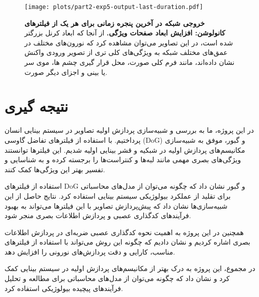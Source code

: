                 \begin{figure}[!ht]
                    \centering
                    \texttt{[image: plots/part2-exp5-output-last-duration.pdf]} 
                    \captionsetup{width=.9\linewidth}
                    \caption{\textbf{ خروجی شبکه در آخرین پنجره زمانی برای هر یک از فیلترهای کانولوشن: افزایش ابعاد صفحات ویژگی. } از آنجا که ابعاد کرنل بزرگتر شده است، در این تصاویر می‌توان مشاهده کرد که نورون‌های مختلف در عمق‌های مختلف شبکه به ویژگی‌های کلی تری از تصویر ورودی واکنش نشان داده‌اند، مانند فرم کلی صورت، محل قرار گیری چشم ها، موی سر یا بینی و اجزای دیگر صورت. 
                    }
                    \label{fig:part2-exp5-output-last-duration}
                \end{figure}
    
                \clearpage
    
    \section*{نتیجه گیری}
        در این پروژه، ما به بررسی و شبیه‌سازی پردازش اولیه تصاویر در سیستم بینایی انسان پرداختیم. با استفاده از فیلترهای تفاضل گاوسی 
        (DoG) 
        و گبور، موفق به شبیه‌سازی مکانیسم‌های پردازش اولیه در شبکیه و قشر بینایی اولیه
        شدیم. این فیلترها توانستند ویژگی‌های بصری مهمی مانند لبه‌ها و کنتراست‌ها را برجسته کرده و به شناسایی و تفسیر بهتر این ویژگی‌ها کمک کنند.

        استفاده از فیلترهای 
        DoG 
        و گبور نشان داد که چگونه می‌توان از مدل‌های محاسباتی برای تقلید از عملکرد بیولوژیکی سیستم بینایی استفاده کرد. نتایج حاصل از این شبیه‌سازی‌ها نشان داد که پیش‌پردازش تصاویر با این فیلترها می‌تواند به بهبود فرآیندهای کدگذاری عصبی و پردازش اطلاعات بصری منجر شود.
        
        همچنین در این پروژه به اهمیت نحوه کدگذاری عصبی ضربه‌ای 
        در پردازش اطلاعات بصری اشاره کردیم و نشان دادیم که چگونه این روش می‌تواند با استفاده از فیلترهای مناسب، کارایی و دقت پردازش‌های نورونی را افزایش دهد.
        
        در مجموع، این پروژه به درک بهتر از مکانیسم‌های پردازش اولیه در سیستم بینایی کمک کرد و نشان داد که چگونه می‌توان از مدل‌های محاسباتی برای مطالعه و تحلیل فرآیندهای پیچیده بیولوژیکی استفاده کرد.